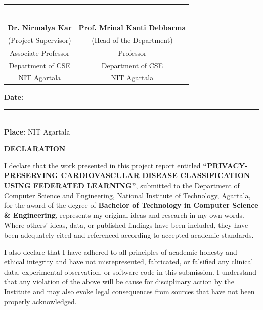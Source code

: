 \documentclass[12pt,a4paper,oneside]{report}
\begin{document}
\vspace{3.5in}

\begin{table}[h]
\centering
\begin{tabular*}{\textwidth}{@{\extracolsep{\fill}}cc}
    \rule{6.5cm}{0.4pt} & \rule{6.5cm}{0.4pt} \\
    \textbf{Dr. Nirmalya Kar} & \textbf{Prof. Mrinal Kanti Debbarma} \\
    (Project Supervisor) & (Head of the Department) \\
    Associate Professor & Professor \\
    Department of CSE & Department of CSE \\
    NIT Agartala & NIT Agartala
\end{tabular*}
\end{table}

\vspace{1.0cm}
\noindent \textbf{Date:} \rule{4cm}{0.4pt}\\
\noindent \textbf{Place:} NIT Agartala

\cleardoublepage
\thispagestyle{plain}
\begin{center}
    \vspace*{0.5in}
    {\Large \textbf{DECLARATION}\par}
    \vspace{0.8in}
\end{center}

\noindent I declare that the work presented in this project report entitled \textbf{``PRIVACY-PRESERVING CARDIOVASCULAR DISEASE CLASSIFICATION USING FEDERATED LEARNING''}, submitted to the Department of Computer Science and Engineering, National Institute of Technology, Agartala, for the award of the degree of \textbf{Bachelor of Technology in Computer Science \& Engineering}, represents my original ideas and research in my own words. Where others' ideas, data, or published findings have been included, they have been adequately cited and referenced according to accepted academic standards.

\vspace{0.4cm}
\noindent I also declare that I have adhered to all principles of academic honesty and ethical integrity and have not misrepresented, fabricated, or falsified any clinical data, experimental observation, or software code in this submission. I understand that any violation of the above will be cause for disciplinary action by the Institute and may also evoke legal consequences from sources that have not been properly acknowledged.
\end{document}
